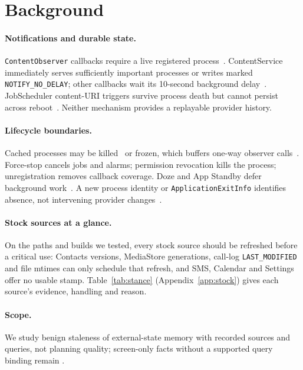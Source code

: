 \section{Background}
\label{sec:background}
\paragraph{Notifications and durable state.} \texttt{ContentObserver} callbacks require a live registered process~\cite{android_contentobserver,aosp_contentservice}. ContentService immediately serves sufficiently important processes or writes marked \texttt{NOTIFY\_NO\_DELAY}; other callbacks wait its 10-second background delay~\cite{aosp_contentservice}. JobScheduler content-URI triggers survive process death but cannot persist across reboot~\cite{aosp_jobinfo}. Neither mechanism provides a replayable provider history.

\paragraph{Lifecycle boundaries.} Cached processes may be killed~\cite{lebeck2020marvin,liang2020acclaim} or frozen, which buffers one-way observer calls~\cite{android_freezer}. Force-stop cancels jobs and alarms; permission revocation kills the process; unregistration removes callback coverage. Doze and App Standby defer background work~\cite{android_doze}. A new process identity or \texttt{ApplicationExitInfo} identifies absence, not intervening provider changes~\cite{android_exitinfo}.

\paragraph{Stock sources at a glance.}\label{sec:stance} On the paths and builds we tested, every stock source should be refreshed before a critical use: Contacts versions, MediaStore generations, call-log \texttt{LAST\_MODIFIED} and file mtimes can only schedule that refresh, and SMS, Calendar and Settings offer no usable stamp. Table~\ref{tab:stance} (Appendix~\ref{app:stock}) gives each source's evidence, handling and reason.

\paragraph{Scope.} We study benign staleness of external-state memory with recorded sources and queries, not planning quality; screen-only facts without a supported query binding remain \Unknown.
